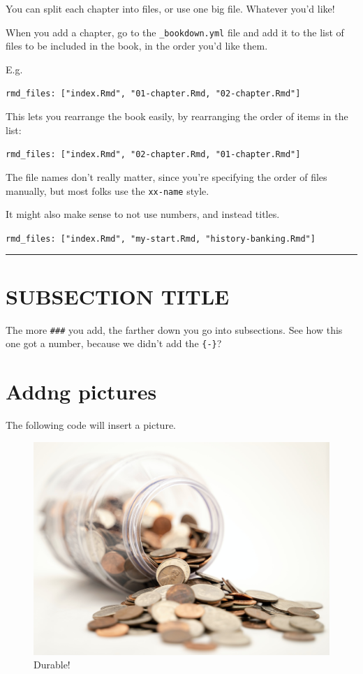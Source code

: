 \documentclass[
]{book}
\begin{document}
You can split each chapter into files, or use one big file. Whatever you'd like!

When you add a chapter, go to the \texttt{\_bookdown.yml} file and add it to the list of files to be included in the book, in the order you'd like them.

E.g.

\texttt{rmd\_files:\ {[}"index.Rmd",\ "01-chapter.Rmd,\ "02-chapter.Rmd"{]}}

This lets you rearrange the book easily, by rearranging the order of items in the list:

\texttt{rmd\_files:\ {[}"index.Rmd",\ "02-chapter.Rmd,\ "01-chapter.Rmd"{]}}

The file names don't really matter,
since you're specifying the order of files manually,
but most folks use the \texttt{xx-name} style.

It might also make sense to not use numbers, and instead titles.

\texttt{rmd\_files:\ {[}"index.Rmd",\ "my-start.Rmd,\ "history-banking.Rmd"{]}}

\begin{center}\rule{0.5\linewidth}{0.5pt}\end{center}

\hypertarget{subsection-title-1}{%
\section{SUBSECTION TITLE}\label{subsection-title-1}}

The more \texttt{\#\#\#} you add, the farther down you go into subsections.
See how this one got a number, because we didn't add the \texttt{\{-\}}?

\hypertarget{addng-pictures}{%
\section*{Addng pictures}\label{addng-pictures}}


The following code will insert a picture.

\begin{figure}
\centering
\includegraphics{images/coins.jpg}
\caption{\label{fig:example-coins}Durable!}
\end{figure}
\end{document}
